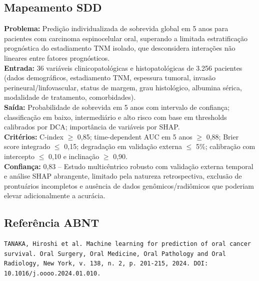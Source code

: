 \subsection{Mapeamento SDD}
\textbf{Problema:} Predição individualizada de sobrevida global em 5 anos
para pacientes com carcinoma espinocelular oral, superando a limitada
estratificação prognóstica do estadiamento TNM isolado, que desconsidera
interações não lineares entre fatores prognósticos. \\
\textbf{Entrada:} 36 variáveis clinicopatológicas e histopatológicas de
3.256 pacientes (dados demográficos, estadiamento TNM, espessura tumoral,
invasão perineural/linfovascular, status de margem, grau histológico,
albumina sérica, modalidade de tratamento, comorbidades). \\
\textbf{Saída:} Probabilidade de sobrevida em 5 anos com intervalo de
confiança; classificação em baixo, intermediário e alto risco com base
em thresholds calibrados por DCA; importância de variáveis por SHAP. \\
\textbf{Critérios:} C-index $\geq$ 0,85; time-dependent AUC em 5 anos
$\geq$ 0,88; Brier score integrado $\leq$ 0,15; degradação em validação
externa $\leq$ 5\%; calibração com intercepto $\leq$ 0,10 e inclinação
$\geq$ 0,90. \\
\textbf{Confiança:} 0,83 -- Estudo multicêntrico robusto com validação
externa temporal e análise SHAP abrangente, limitado pela natureza
retrospectiva, exclusão de prontuários incompletos e ausência de dados
genômicos/radiômicos que poderiam elevar adicionalmente a acurácia.

\subsection{Referência ABNT}
\begin{verbatim}
TANAKA, Hiroshi et al. Machine learning for prediction of oral cancer
survival. Oral Surgery, Oral Medicine, Oral Pathology and Oral
Radiology, New York, v. 138, n. 2, p. 201-215, 2024. DOI:
10.1016/j.oooo.2024.01.010.
\end{verbatim}
\endinput
